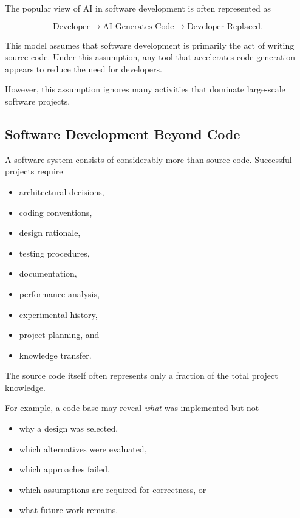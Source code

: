 \documentclass[11pt]{article}
\begin{document}
The popular view of AI in software development is often represented as

\begin{equation}
\text{Developer} \rightarrow \text{AI Generates Code}
\rightarrow \text{Developer Replaced}.
\end{equation}

This model assumes that software development is primarily the act of
writing source code. Under this assumption, any tool that accelerates
code generation appears to reduce the need for developers.

However, this assumption ignores many activities that dominate
large-scale software projects.

\subsection{Software Development Beyond Code}

A software system consists of considerably more than source code.
Successful projects require

\begin{itemize}
\item architectural decisions,
\item coding conventions,
\item design rationale,
\item testing procedures,
\item documentation,
\item performance analysis,
\item experimental history,
\item project planning, and
\item knowledge transfer.
\end{itemize}

The source code itself often represents only a fraction of the total
project knowledge.

For example, a code base may reveal \emph{what} was implemented but not

\begin{itemize}
\item why a design was selected,
\item which alternatives were evaluated,
\item which approaches failed,
\item which assumptions are required for correctness, or
\item what future work remains.
\end{itemize}
\end{document}
